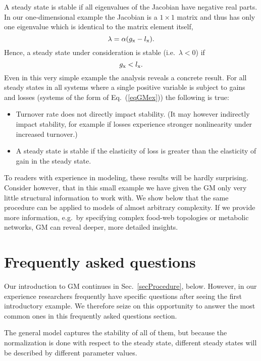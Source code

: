 \documentclass{article}
\newcommand{\eq}[1]{\begin{equation}#1\end{equation}}
\begin{document}
A steady state is stable if all eigenvalues of the Jacobian have negative real parts. In our one-dimensional example the Jacobian is a $1\times 1$ matrix and thus has only one eigenvalue which is identical to the matrix element itself, 
\eq{
\lambda = \alpha (g_{\rm x} - l_{\rm x}).
}
Hence, a steady state under consideration is stable (i.e.~$\lambda<0$) if
\eq{
g_{\rm x}<l_{\rm x}.
}
Even in this very simple example the analysis reveals a concrete result. For all steady states in all systems where a single positive variable is subject to gains and losses (systems of the form of Eq.~(\ref{eqGMex})) the following is true:
\begin{itemize}
    \item Turnover rate does not directly impact stability. (It may however indirectly impact stability, for example if losses experience stronger nonlinearity under increased turnover.)
    \item A steady state is stable if the elasticity of loss is greater than the elasticity of gain in the steady state.
\end{itemize}
To readers with experience in modeling, these results will be hardly surprising. Consider however, that in this small example we have given the GM only very little structural information to work with. We show below that the same procedure can be applied to models of almost arbitrary complexity. If we provide more information, e.g.~by specifying complex food-web topologies or metabolic networks, GM can reveal deeper, more detailed insights.  

\section{Frequently asked questions}
Our introduction to GM continues in Sec.~\ref{secProcedure}, below. However, in our experience researchers frequently have specific questions after seeing the first introductory example. We therefore seize on this opportunity to answer the most common ones in this frequently asked questions section.\vspace{2mm} 

The general model captures the stability of all of them, but because the normalization is done with respect to the steady state, different steady states will be described by different parameter values.\vspace{2mm}
\end{document}
